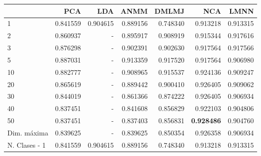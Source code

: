 \begin{tabular}{lrrrrrr}
\toprule
{} &       PCA &       LDA &      ANMM &     DMLMJ &       NCA &      LMNN \\
\midrule
1             &  0.841559 &  0.904615 &  0.889156 &  0.748340 &  0.913218 &  0.913315 \\
2             &  0.860937 &  -        &  0.895917 &  0.908919 &  0.915344 &  0.917616 \\
3             &  0.876298 &  -        &  0.902391 &  0.902630 &  0.917564 &  0.917566 \\
5             &  0.887031 &  -        &  0.913359 &  0.917520 &  0.917564 &  0.906980 \\
10            &  0.882777 &  -        &  0.908965 &  0.915537 &  0.924136 &  0.909247 \\
20            &  0.865619 &  -        &  0.889442 &  0.900410 &  0.926405 &  0.909062 \\
30            &  0.844019 &  -        &  0.861366 &  0.874222 &  0.926405 &  0.906934 \\
40            &  0.837451 &  -        &  0.841608 &  0.856829 &  0.922103 &  0.904806 \\
50            &  0.837451 &  -        &  0.837403 &  0.856831 &  \textbf{0.928486} &  0.904760 \\
Dim. máxima   &  0.839625 &  -        &  0.839625 &  0.850354 &  0.926358 &  0.906934 \\
N. Clases - 1 &  0.841559 &  0.904615 &  0.889156 &  0.748340 &  0.913218 &  0.913315 \\
\bottomrule
\end{tabular}
